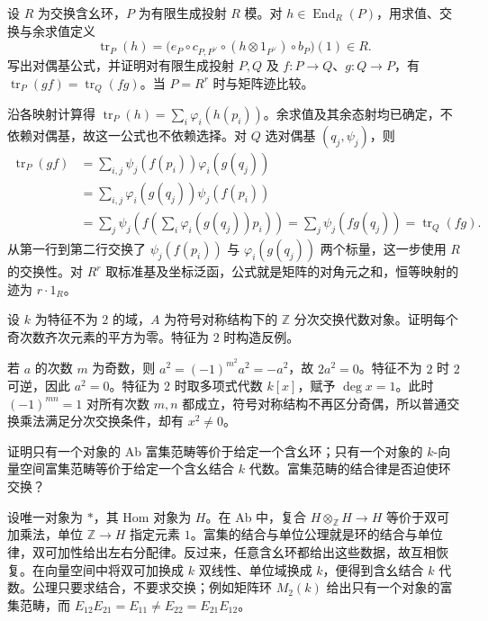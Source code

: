 \begin{exercise}\label{b4:ex:dualizable-trace-cyclicity}
	设 \(R\) 为交换含幺环，\(P\) 为有限生成投射 \(R\) 模。对 \(h\in\operatorname{End}_R(P)\)，用求值、交换与余求值定义
	\[
		\operatorname{tr}_P(h)= \bigl(e_P\circ c_{P,P^\vee}\circ(h\otimes1_{P^\vee})\circ b_P\bigr)(1)\in R.
	\]
	写出对偶基公式，并证明对有限生成投射 \(P,Q\) 及 \(f:P\to Q\)、\(g:Q\to P\)，有 \(\operatorname{tr}_P(gf)=\operatorname{tr}_Q(fg)\)。当 \(P=R^r\) 时与矩阵迹比较。
\end{exercise}
\begin{solution}
	沿各映射计算得 \(\operatorname{tr}_P(h)=\sum_i\varphi_i(h(p_i))\)。余求值及其余态射均已确定，不依赖对偶基，故这一公式也不依赖选择。对 \(Q\) 选对偶基 \((q_j,\psi_j)\)，则
	\[
		\begin{aligned}
			\operatorname{tr}_P(gf) &=\sum_{i,j}\psi_j(f(p_i))\varphi_i(g(q_j))\\
			&=\sum_{i,j}\varphi_i(g(q_j))\psi_j(f(p_i))\\
			&=\sum_j\psi_j\left(f\left(\sum_i\varphi_i(g(q_j))p_i\right)\right) =\sum_j\psi_j(fg(q_j))=\operatorname{tr}_Q(fg).
		\end{aligned}
	\]
	从第一行到第二行交换了 \(\psi_j(f(p_i))\) 与 \(\varphi_i(g(q_j))\) 两个标量，这一步使用 \(R\) 的交换性。对 \(R^r\) 取标准基及坐标泛函，公式就是矩阵的对角元之和，恒等映射的迹为 \(r\cdot1_R\)。
\end{solution}

\begin{exercise}\label{b4:ex:graded-odd-squares}
	设 \(k\) 为特征不为 \(2\) 的域，\(A\) 为符号对称结构下的 \(\mathbb Z\) 分次交换代数对象。证明每个奇次数齐次元素的平方为零。特征为 \(2\) 时构造反例。
\end{exercise}
\begin{solution}
	若 \(a\) 的次数 \(m\) 为奇数，则 \(a^2=(-1)^{m^2}a^2=-a^2\)，故 \(2a^2=0\)。特征不为 \(2\) 时 \(2\) 可逆，因此 \(a^2=0\)。特征为 \(2\) 时取多项式代数 \(k[x]\)，赋予 \(\deg x=1\)。此时 \((-1)^{mn}=1\) 对所有次数 \(m,n\) 都成立，符号对称结构不再区分奇偶，所以普通交换乘法满足分次交换条件，却有 \(x^2\ne0\)。
\end{solution}

\begin{exercise}\label{b4:ex:one-object-enrichment}
	证明只有一个对象的 Ab 富集范畴等价于给定一个含幺环；只有一个对象的 \(k\)-向量空间富集范畴等价于给定一个含幺结合 \(k\) 代数。富集范畴的结合律是否迫使环交换？
\end{exercise}
\begin{solution}
	设唯一对象为 \(*\)，其 Hom 对象为 \(H\)。在 Ab 中，复合 \(H\otimes_{\mathbb Z}H\to H\) 等价于双可加乘法，单位 \(\mathbb Z\to H\) 指定元素 \(1\)。富集的结合与单位公理就是环的结合与单位律，双可加性给出左右分配律。反过来，任意含幺环都给出这些数据，故互相恢复。在向量空间中将双可加换成 \(k\) 双线性、单位域换成 \(k\)，便得到含幺结合 \(k\) 代数。公理只要求结合，不要求交换；例如矩阵环 \(M_2(k)\) 给出只有一个对象的富集范畴，而 \(E_{12}E_{21}=E_{11}\ne E_{22}=E_{21}E_{12}\)。
\end{solution}

